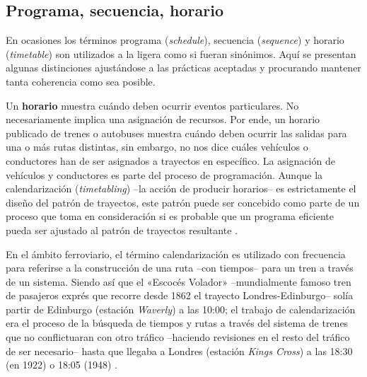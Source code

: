\documentclass[draft,12pt,headsepline,footsepline,paper=letter]{scrreprt}
\begin{document}
\subsection{Programa, secuencia, horario}
\label{programa_secuencia_horario}

En ocasiones los términos programa (\textit{schedule}), secuencia (\textit{sequence}) y horario (\textit{timetable}) son utilizados a la ligera como si fueran sinónimos. Aquí se presentan algunas distinciones ajustándose a las prácticas aceptadas y procurando mantener tanta coherencia como sea posible.

Un \textbf{horario} muestra cuándo deben ocurrir eventos particulares. No necesariamente implica una asignación de recursos. Por ende, un horario publicado de trenes o autobuses muestra cuándo deben ocurrir las salidas para una o más rutas distintas, sin embargo, no nos dice cuáles vehículos o conductores han de ser asignados a trayectos en específico.
%
La asignación de vehículos y conductores es parte del proceso de programación. Aunque la calendarización (\textit{timetabling}) –la acción de producir horarios– es estrictamente el diseño del patrón de trayectos, este patrón puede ser concebido como parte de un proceso que toma en consideración si es probable que un programa eficiente pueda ser ajustado al patrón de trayectos resultante \cite[p.~48]{wren95scheduling-timetabling}.

En el ámbito ferroviario, el término calendarización es utilizado con frecuencia para referirse a la construcción de una ruta –con tiempos– para un tren a través de un sistema. Siendo así que el «Escocés Volador» –mundialmente famoso tren de pasajeros exprés que recorre desde 1862 el trayecto Londres-Edinburgo– solía partir de Edinburgo (estación \textit{Waverly}) a las 10:00; el trabajo de calendarización era el proceso de la búsqueda de tiempos y rutas a través del sistema de trenes que no conflictuaran con otro tráfico –haciendo revisiones en el resto del tráfico de ser necesario– hasta que llegaba a Londres (estación \textit{Kings Cross}) a las 18:30 (en 1922) o 18:05 (1948) 
\citep[p.~48, 49]{wren95scheduling-timetabling}.
\end{document}
